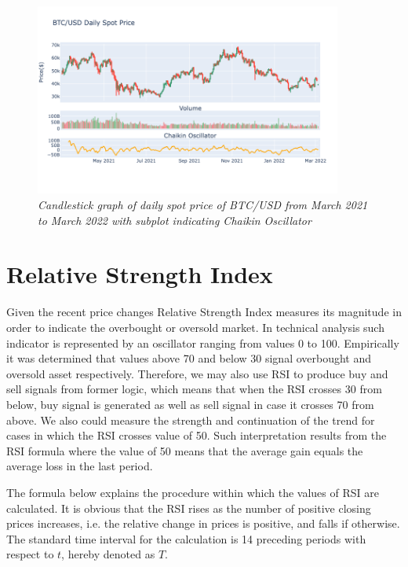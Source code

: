 \begin{figure}[ht]

\begin{center}
	\includegraphics[width=0.9\textwidth]{Figs/Chaikin.png}
\end{center}

\caption{\textit{ Candlestick graph of daily spot price of BTC/USD from March 2021 to March 2022 with subplot indicating Chaikin Oscillator}}

\end{figure}


\section{Relative Strength Index}

Given the recent price changes Relative Strength Index measures its magnitude in order to indicate the overbought or oversold market. In technical analysis such indicator is represented by an oscillator ranging from values 0 to 100. Empirically 
it was determined that values above 70 and below 30 signal overbought and oversold asset respectively. Therefore, we may also use RSI to produce buy and sell signals from former logic, which means that when the RSI crosses 30 from below, buy signal is generated as well as sell signal in case it crosses 70 from above. We also could measure the strength and continuation of the trend for cases in which the RSI crosses value of 50. Such interpretation results from the RSI formula where the value of 50 means that the average gain equals the average loss in the last period.

The formula below explains the procedure within which the values of RSI are calculated. It is obvious that the RSI rises as the number of positive closing prices increases, i.e. the relative change in prices is positive, and falls if otherwise. The standard time interval for  the calculation is 14 preceding periods with respect to $t$, hereby denoted as $T$.

